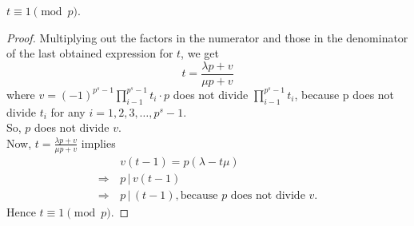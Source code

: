 \documentclass[../main-sheet.tex]{subfiles}
\begin{document}
\begin{cor}\label{cor:10.3}
    \(t \equiv 1 \pmod{p}\).
\end{cor}
\begin{proof}
    Multiplying out the factors in the numerator and those in the denominator of the
    last obtained expression for \(t\), we get
    \[t=\frac{\lambda p+v}{\mu p+v}\]
    where \(v=(-1)^{p^s-1}\prod_{i-1}^{p^s-1}t_i\cdot p\) does not divide \(\prod_{i-1}^{p^s-1}t_i\), because p does not divide \(t_i\) for any \(i=1,2,3,\dots,p^s-1\).\\
    So, \(p\) does not divide \(v\).\\
    Now, \(t =\frac{\lambda p+v}{\mu p+v}\) implies 
    \begin{align*}
        &v(t - 1) = p(\lambda - t\mu)\\
        \Rightarrow\,& p\,|\,v (t- 1)\\
        \Rightarrow\,& p \,|\, (t - 1), \text{because \(p\) does not divide }v.    
    \end{align*}
    Hence \(t \equiv 1\pmod{p}\).
\end{proof}
\end{document}
